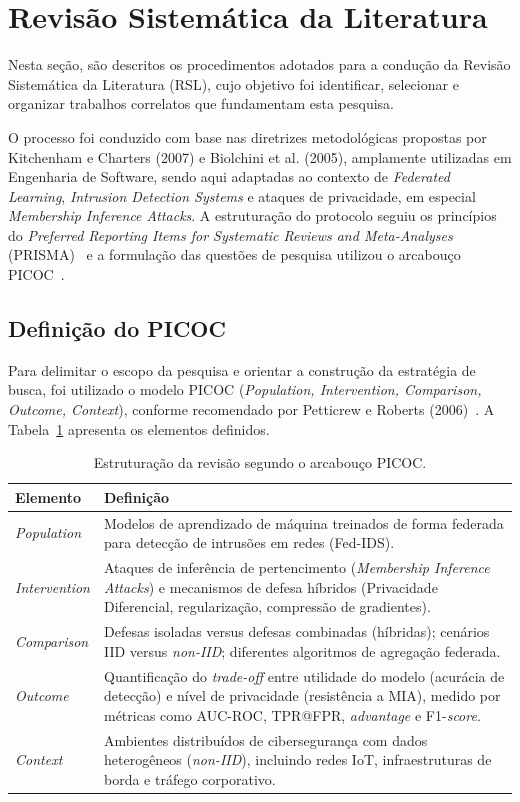 \documentclass[
	12pt,				%
	openright,			%
	oneside,			%
	a4paper,			%
	english,			%
	french,				%
	spanish,			%
	brazil,				%
	]{abntex2}
\begin{document}
\section{Revisão Sistemática da Literatura}

Nesta seção, são descritos os procedimentos adotados para a condução da Revisão
Sistemática da Literatura (RSL), cujo objetivo foi identificar, selecionar e organizar
trabalhos correlatos que fundamentam esta pesquisa.

O processo foi conduzido com base nas diretrizes metodológicas propostas por
Kitchenham e Charters (2007) e Biolchini et al. (2005), amplamente utilizadas em
Engenharia de Software, sendo aqui adaptadas ao contexto de \textit{Federated Learning},
\textit{Intrusion Detection Systems} e ataques de privacidade, em especial \textit{Membership
Inference Attacks}. A estruturação do protocolo seguiu os princípios do \textit{Preferred Reporting Items for Systematic Reviews and Meta-Analyses} (PRISMA)~\cite{page2021prisma} e a formulação das questões de pesquisa utilizou o arcabouço PICOC~\cite{petticrew2006systematic}.

\subsection{Definição do PICOC}

Para delimitar o escopo da pesquisa e orientar a construção da estratégia de busca, foi utilizado o modelo PICOC (\textit{Population, Intervention, Comparison, Outcome, Context}), conforme recomendado por Petticrew e Roberts (2006)~\cite{petticrew2006systematic}. A Tabela~\ref{tab:picoc} apresenta os elementos definidos.

\begin{table}[H]
\centering
\caption{Estruturação da revisão segundo o arcabouço PICOC.}
\label{tab:picoc}
\begin{tabular}{p{3cm} p{10cm}}
\hline
\textbf{Elemento} & \textbf{Definição} \\
\hline
\textit{Population} & Modelos de aprendizado de máquina treinados de forma federada para detecção de intrusões em redes (Fed-IDS). \\
\textit{Intervention} & Ataques de inferência de pertencimento (\textit{Membership Inference Attacks}) e mecanismos de defesa híbridos (Privacidade Diferencial, regularização, compressão de gradientes). \\
\textit{Comparison} & Defesas isoladas versus defesas combinadas (híbridas); cenários IID versus \textit{non-IID}; diferentes algoritmos de agregação federada. \\
\textit{Outcome} & Quantificação do \textit{trade-off} entre utilidade do modelo (acurácia de detecção) e nível de privacidade (resistência a MIA), medido por métricas como AUC-ROC, TPR@FPR, \textit{advantage} e F1-\textit{score}. \\
\textit{Context} & Ambientes distribuídos de cibersegurança com dados heterogêneos (\textit{non-IID}), incluindo redes IoT, infraestruturas de borda e tráfego corporativo. \\
\hline
\end{tabular}
\end{table}
\end{document}
